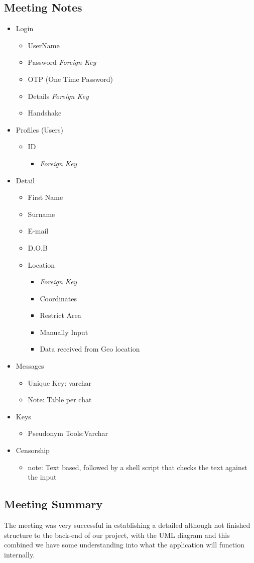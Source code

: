 \documentclass{article}
\begin{document}
\subsection{Meeting Notes}
\begin{itemize}
    \item Login
	\begin{itemize}
	\item UserName
	\item Password \textit{Foreign Key}
	\item OTP (One Time Password)
	\item Details \textit{Foreign Key}
	\item Handshake
	\end{itemize}
   \item Profiles (Users)
	\begin{itemize}
	\item ID 
		\begin{itemize}
			\item \textit{Foreign Key}
		\end{itemize}
	\end{itemize}
	\item Detail
		\begin{itemize}
			\item First Name
			\item Surname
			\item E-mail
			\item D.O.B
			\item Location
			\begin{itemize}
				\item \textit{Foreign Key}
				\item Coordinates
				\item Restrict Area
				\item Manually Input
				\item Data received from Geo location
			\end{itemize}
		\end{itemize}
	\item Messages
		\begin{itemize}
		\item Unique Key: varchar
		\item Note: Table per chat
		\end{itemize}
	\item Keys
		\begin{itemize}
		\item Pseudonym Tools:Varchar
		\end{itemize}
	\item Censorship
		\begin{itemize}
		\item note: Text based, followed by a shell script that checks the text against the input
		\end{itemize}
\end{itemize}


\subsection{Meeting Summary}

The meeting was very successful in establishing a detailed although not finished structure to the back-end of our project, with the UML diagram and this combined we have some understanding into what the application will function internally.
\end{document}
